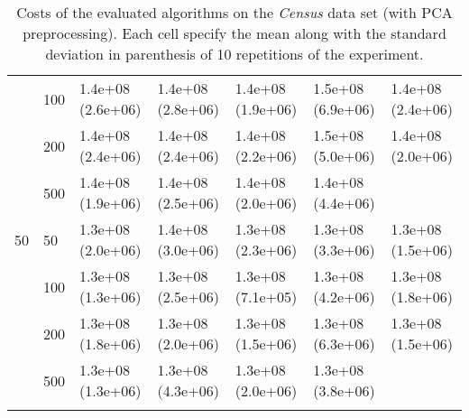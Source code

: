 \begin{longtable}{lllllll}
   & 100 &  1.4e+08 (2.6e+06) &  1.4e+08 (2.8e+06) &  1.4e+08 (1.9e+06) &    1.5e+08 (6.9e+06) &  1.4e+08 (2.4e+06) \\
   & 200 &  1.4e+08 (2.4e+06) &  1.4e+08 (2.4e+06) &  1.4e+08 (2.2e+06) &    1.5e+08 (5.0e+06) &  1.4e+08 (2.0e+06) \\
   & 500 &  1.4e+08 (1.9e+06) &  1.4e+08 (2.5e+06) &  1.4e+08 (2.0e+06) &    1.4e+08 (4.4e+06) &       \\
 \midrule
50 & 50  &  1.3e+08 (2.0e+06) &  1.4e+08 (3.0e+06) &  1.3e+08 (2.3e+06) &    1.3e+08 (3.3e+06) &  1.3e+08 (1.5e+06) \\
   & 100 &  1.3e+08 (1.3e+06) &  1.3e+08 (2.5e+06) &  1.3e+08 (7.1e+05) &    1.3e+08 (4.2e+06) &  1.3e+08 (1.8e+06) \\
   & 200 &  1.3e+08 (1.8e+06) &  1.3e+08 (2.0e+06) &  1.3e+08 (1.5e+06) &    1.3e+08 (6.3e+06) &  1.3e+08 (1.5e+06) \\
   & 500 &  1.3e+08 (1.3e+06) &  1.3e+08 (4.3e+06) &  1.3e+08 (2.0e+06) &    1.3e+08 (3.8e+06) &                 \\
\bottomrule
\caption{Costs of the evaluated algorithms on the \textit{Census} data set (with PCA preprocessing). Each cell specify the mean along with the standard deviation in parenthesis of 10 repetitions of the experiment.}
\label{tab:real-cost-mean-std-census-pca}
\end{longtable}


